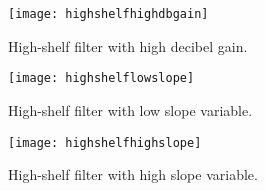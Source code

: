 \begin{figure}[!h] 
\centering
\texttt{[image: highshelfhighdbgain]}
\caption{\label{fig:highshelfhighdbgain} High-shelf filter with high decibel gain.}
\end{figure}

\begin{figure}[!h] 
\centering
\texttt{[image: highshelflowslope]}
\caption{\label{fig:highshelflowslope} High-shelf filter with low slope variable.}
\end{figure}

\begin{figure}[!h] 
\centering
\texttt{[image: highshelfhighslope]}
\caption{\label{fig:highshelfhighslope} High-shelf filter with high slope variable.}
\end{figure}
